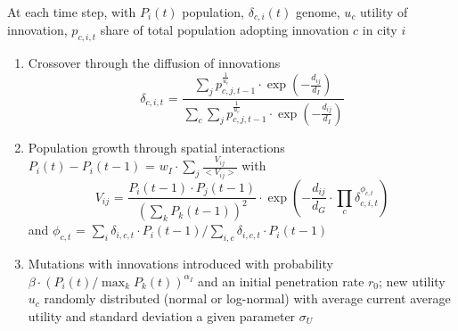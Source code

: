 {At each time step, with $P_i \left(t\right)$ population, $\delta_{c,i}\left(t\right)$ genome, $u_c$ utility of innovation, $p_{c,i,t}$ share of total population adopting innovation $c$ in city $i$
\begin{enumerate}
	\item Crossover through the diffusion of innovations
	\[
	\delta_{c,i,t} \textrm{ = } \frac{\sum_j p_{c,j,t-1}^{\frac{1}{u_c}} \cdot \exp{\left(-\frac{d_{ij}}{d_I}\right)}}{\sum_c \sum_j p_{c,j,t-1}^{\frac{1}{u_c}} \cdot \exp{\left(-\frac{d_{ij}}{d_I}\right)}}	
	\]
	\item Population growth through spatial interactions $P_i\left(t\right) - P_i\left(t-1\right) \textrm{ = } w_I\cdot \sum_j \frac{V_{ij}}{<V_{ij}>}$ with
	\[ 
	V_{ij} \textrm{ = } \frac{P_{i}\left(t-1\right) \cdot P_{j}\left(t-1\right)}{\left(\sum_k P_k\left(t-1\right)\right)^2} \cdot \exp{\left(-\frac{d_{ij}}{d_G} \cdot \prod_c \delta_{c,i,t}^{\phi_{c,t}}\right)}
	\]
	and $\phi_{c,t} \textrm{ = } \sum_i \delta_{i,c,t}\cdot P_i\left(t-1\right) /\sum_{i,c} \delta_{i,c,t}\cdot P_{i}\left(t-1\right)$
	\item Mutations with innovations introduced with probability $\beta \cdot \left(P_i \left(t\right) / \max_k P_k \left(t\right)\right)^{\alpha_I}$ and an initial penetration rate $r_0$; new utility $u_c$ randomly distributed (normal or log-normal) with average current average utility and standard deviation a given parameter $\sigma_U$
\end{enumerate}



}


